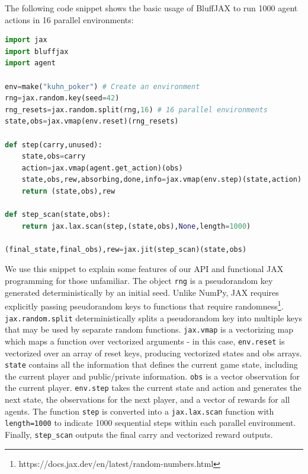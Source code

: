 The following code snippet shows the basic usage of BluffJAX to run 1000 agent actions in 16 parallel environments:

\begin{lstlisting}[language=Python]
import jax
import bluffjax
import agent

env=make("kuhn_poker") # Create an environment
rng=jax.random.key(seed=42)
rng_resets=jax.random.split(rng,16) # 16 parallel environments
state,obs=jax.vmap(env.reset)(rng_resets)

def step(carry,unused):
    state,obs=carry
    action=jax.vmap(agent.get_action)(obs)
    state,obs,rew,absorbing,done,info=jax.vmap(env.step)(state,action)
    return (state,obs),rew

def step_scan(state,obs):
    return jax.lax.scan(step,(state,obs),None,length=1000)
    
(final_state,final_obs),rew=jax.jit(step_scan)(state,obs)
\end{lstlisting}

We use this snippet to explain some features of our API and functional JAX programming for those unfamiliar. The object \texttt{rng} is a pseudorandom key generated deterministically by an initial seed. Unlike NumPy, JAX requires explicitly passing pseudorandom keys to functions that require randomness\footnote{https://docs.jax.dev/en/latest/random-numbers.html}. \texttt{jax.random.split} deterministically splits a pseudorandom key into multiple keys that may be used by separate random functions. \texttt{jax.vmap} is a vectorizing map which maps a function over vectorized arguments - in this case, \texttt{env.reset} is vectorized over an array of reset keys, producing vectorized states and obs arrays. \texttt{state} contains all the information that defines the current game state, including the current player and public/private information. \texttt{obs} is a vector observation for the current player. \texttt{env.step} takes the current state and action and generates the next state, the observations for the next player, and a vector of rewards for all agents. The function \texttt{step} is converted into a \texttt{jax.lax.scan} function with \texttt{length=1000} to indicate 1000 sequential steps within each parallel environment. Finally, \texttt{step_scan} outputs the final carry and vectorized reward outputs.